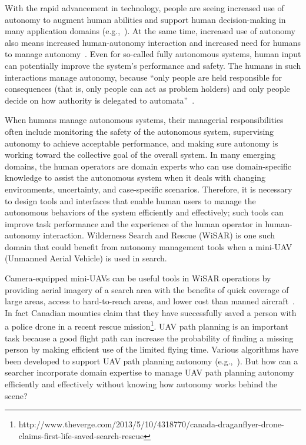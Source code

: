 With the rapid advancement in technology, people are seeing increased use of autonomy to augment human abilities and support human decision-making in many application domains (e.g.,~\cite{Chun2010Limousine,Casper2003Human,Lin2010Supporting,Robins2009From}). At the same time, increased use of autonomy also means increased human-autonomy interaction and increased need for humans to manage autonomy~\cite{Bainbridge1983Ironies}. Even for so-called fully autonomous systems, human input can potentially improve the system's performance and safety. The humans in such interactions manage autonomy, because ``only people are held responsible for consequences (that is, only people can act as problem holders) and only people decide on how authority is delegated to automata''~\cite{Woods2006Joint,Bradshaw2013Seven}.

When humans manage autonomous systems, their managerial responsibilities often include monitoring the safety of the autonomous system, supervising autonomy to achieve acceptable performance, and making sure autonomy is working toward the collective goal of the overall system. In many emerging domains, the human operators are domain experts who can use domain-specific knowledge to assist the autonomous system when it deals with changing environments, uncertainty, and case-specific scenarios. Therefore, it is necessary to design tools and interfaces that enable human users to manage the autonomous behaviors of the system efficiently and effectively; such tools can improve task performance and the experience of the human operator in human-autonomy interaction. Wilderness Search and Rescue (WiSAR) is one such domain that could benefit from autonomy management tools when a mini-UAV (Unmanned Aerial Vehicle) is used in search.

Camera-equipped mini-UAVs can be useful tools in WiSAR operations by providing aerial imagery of a search area with the benefits of quick coverage of large areas, access to hard-to-reach areas, and lower cost than manned aircraft~\cite{Murphy2008Cooperative, Goodrich2008Supporting}. In fact Canadian mounties claim that they have successfully saved a person with a police drone in a recent rescue mission\footnote{http://www.theverge.com/2013/5/10/4318770/canada-draganflyer-drone-claims-first-life-saved-search-rescue}. UAV path planning is an important task because a good flight path can increase the probability of finding a missing person by making efficient use of the limited flying time. Various algorithms have been developed to support UAV path planning autonomy (e.g.,~\cite{Bourgault2003Coordinated, Lin2009UAV, Lin2014Hierarchical}). But how can a searcher incorporate domain expertise to manage UAV path planning autonomy efficiently and effectively without knowing how autonomy works behind the scene?
 
